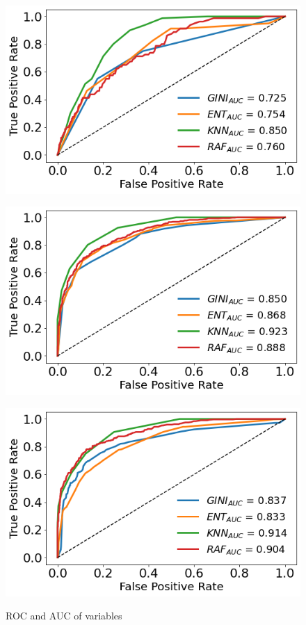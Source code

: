 \documentclass[a4paper,11pt,dvipsnames]{article}
\begin{document}
\begin{figure}[h]
\begin{minipage}[b]{.3\linewidth}
\centering\includegraphics[width=0.9\linewidth]{polysemy_ROC_c.png}\label{fig:polroc}
\end{minipage}    \hfil
\begin{minipage}[b]{.3\linewidth}
\centering\large \includegraphics[width=0.9\linewidth]{aoabinary_ROC_c.png}
\label{fig:aoabinroc}
\end{minipage}    \hfil
\begin{minipage}[b]{.3\linewidth}
\centering\includegraphics[width=0.9\linewidth]{perceivability_ROC_c.png}
\label{fig:perroc}
\end{minipage}


\caption{ROC and AUC of variables}\label{fig:roc}

\end{figure}
\end{document}

